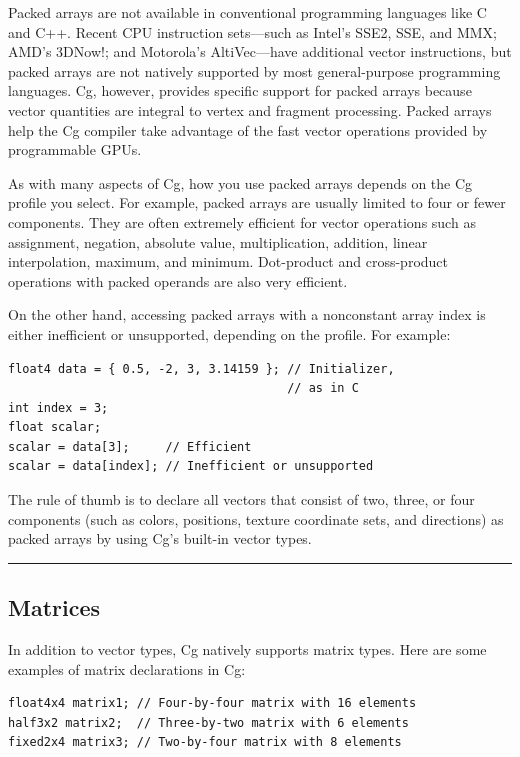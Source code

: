 \documentclass{book}
\begin{document}
Packed arrays are not available in conventional programming languages like C and C++. Recent CPU instruction sets—such as Intel's SSE2, SSE, and MMX; AMD's 3DNow!; and Motorola's AltiVec—have additional vector instructions, but packed arrays are not natively supported by most general-purpose programming languages. Cg, however, provides specific support for packed arrays because vector quantities are integral to vertex and fragment processing. Packed arrays help the Cg compiler take advantage of the fast vector operations provided by programmable GPUs.

As with many aspects of Cg, how you use packed arrays depends on the Cg profile you select. For example, packed arrays are usually limited to four or fewer components. They are often extremely efficient for vector operations such as assignment, negation, absolute value, multiplication, addition, linear interpolation, maximum, and minimum. Dot-product and cross-product operations with packed operands are also very efficient.

On the other hand, accessing packed arrays with a nonconstant array index is either inefficient or unsupported, depending on the profile. For example:

\FloatBarrier
\begin{lstlisting}
float4 data = { 0.5, -2, 3, 3.14159 }; // Initializer,
                                       // as in C
int index = 3;
float scalar;
scalar = data[3];     // Efficient
scalar = data[index]; // Inefficient or unsupported
\end{lstlisting}
\FloatBarrier

The rule of thumb is to declare all vectors that consist of two, three, or four components (such as colors, positions, texture coordinate sets, and directions) as packed arrays by using Cg's built-in vector types.
\hrule

\subsection{Matrices}

In addition to vector types, Cg natively supports matrix types. Here are some examples of matrix declarations in Cg:

\FloatBarrier
\begin{lstlisting}
float4x4 matrix1; // Four-by-four matrix with 16 elements
half3x2 matrix2;  // Three-by-two matrix with 6 elements
fixed2x4 matrix3; // Two-by-four matrix with 8 elements
\end{lstlisting}
\FloatBarrier
\end{document}
